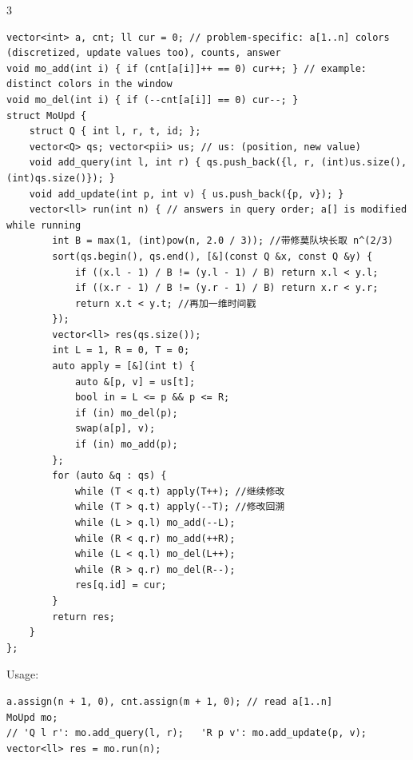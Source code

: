 \documentclass[8pt]{extarticle}
\begin{document}
\begin{multicols*}{3}
\begin{lstlisting}
vector<int> a, cnt; ll cur = 0; // problem-specific: a[1..n] colors (discretized, update values too), counts, answer
void mo_add(int i) { if (cnt[a[i]]++ == 0) cur++; } // example: distinct colors in the window
void mo_del(int i) { if (--cnt[a[i]] == 0) cur--; }
struct MoUpd {
    struct Q { int l, r, t, id; };
    vector<Q> qs; vector<pii> us; // us: (position, new value)
    void add_query(int l, int r) { qs.push_back({l, r, (int)us.size(), (int)qs.size()}); }
    void add_update(int p, int v) { us.push_back({p, v}); }
    vector<ll> run(int n) { // answers in query order; a[] is modified while running
        int B = max(1, (int)pow(n, 2.0 / 3)); //带修莫队块长取 n^(2/3)
        sort(qs.begin(), qs.end(), [&](const Q &x, const Q &y) {
            if ((x.l - 1) / B != (y.l - 1) / B) return x.l < y.l;
            if ((x.r - 1) / B != (y.r - 1) / B) return x.r < y.r;
            return x.t < y.t; //再加一维时间戳
        });
        vector<ll> res(qs.size());
        int L = 1, R = 0, T = 0;
        auto apply = [&](int t) {
            auto &[p, v] = us[t];
            bool in = L <= p && p <= R;
            if (in) mo_del(p);
            swap(a[p], v);
            if (in) mo_add(p);
        };
        for (auto &q : qs) {
            while (T < q.t) apply(T++); //继续修改
            while (T > q.t) apply(--T); //修改回溯
            while (L > q.l) mo_add(--L);
            while (R < q.r) mo_add(++R);
            while (L < q.l) mo_del(L++);
            while (R > q.r) mo_del(R--);
            res[q.id] = cur;
        }
        return res;
    }
};
\end{lstlisting}

Usage:

\begin{lstlisting}
a.assign(n + 1, 0), cnt.assign(m + 1, 0); // read a[1..n]
MoUpd mo;
// 'Q l r': mo.add_query(l, r);   'R p v': mo.add_update(p, v);
vector<ll> res = mo.run(n);
\end{lstlisting}


\end{multicols*}
\end{document}
